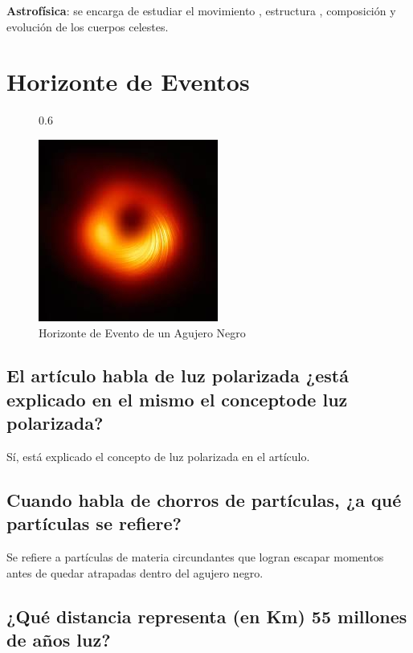 \documentclass[11pt]{article}
\begin{document}
\begin{multicols}{2}
\textbf{Astrofísica}: se encarga de estudiar el movimiento , estructura , composición y evolución de los cuerpos celestes. \cite{fisica}

\section{Horizonte de Eventos}
 \begin{figure}{0.6\linewidth}
  
  \centering
  \includegraphics[width=0.6\linewidth]{hole.jpeg}
   \caption{Horizonte de Evento de un Agujero Negro}
  
\end{figure}

 
\subsection{El artículo habla de luz polarizada ¿está explicado en el mismo el conceptode luz polarizada?}

Sí, está explicado el concepto de luz polarizada en el artículo.

\subsection{Cuando habla de chorros de partículas, ¿a qué partículas se refiere?}
 Se refiere a partículas de materia circundantes que logran escapar momentos antes de quedar atrapadas dentro del agujero negro.

\subsection{¿Qué distancia representa (en Km) 55 millones de años luz?}


\end{multicols}
\end{document}
